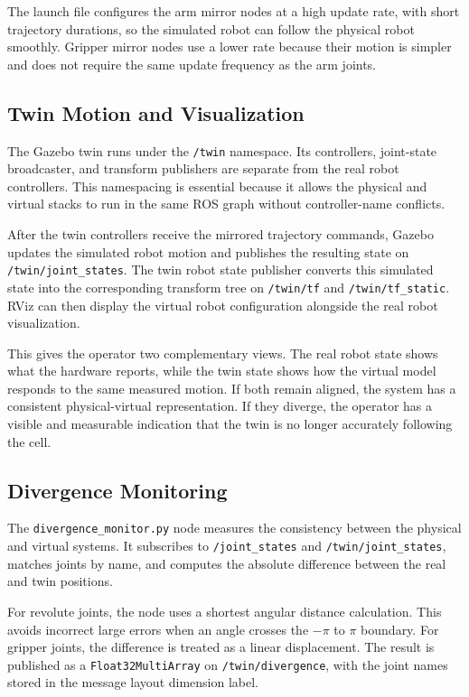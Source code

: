 The launch file configures the arm mirror nodes at a high update rate, with short trajectory durations, so the simulated robot can follow the physical robot smoothly. Gripper mirror nodes use a lower rate because their motion is simpler and does not require the same update frequency as the arm joints.

\subsection{Twin Motion and Visualization}

The Gazebo twin runs under the \texttt{/twin} namespace. Its controllers, joint-state broadcaster, and transform publishers are separate from the real robot controllers. This namespacing is essential because it allows the physical and virtual stacks to run in the same ROS graph without controller-name conflicts.

After the twin controllers receive the mirrored trajectory commands, Gazebo updates the simulated robot motion and publishes the resulting state on \texttt{/twin/joint\_states}. The twin robot state publisher converts this simulated state into the corresponding transform tree on \texttt{/twin/tf} and \texttt{/twin/tf\_static}. RViz can then display the virtual robot configuration alongside the real robot visualization.

This gives the operator two complementary views. The real robot state shows what the hardware reports, while the twin state shows how the virtual model responds to the same measured motion. If both remain aligned, the system has a consistent physical-virtual representation. If they diverge, the operator has a visible and measurable indication that the twin is no longer accurately following the cell.

\subsection{Divergence Monitoring}

The \texttt{divergence\_monitor.py} node measures the consistency between the physical and virtual systems. It subscribes to \texttt{/joint\_states} and \texttt{/twin/joint\_states}, matches joints by name, and computes the absolute difference between the real and twin positions.

For revolute joints, the node uses a shortest angular distance calculation. This avoids incorrect large errors when an angle crosses the \(-\pi\) to \(\pi\) boundary. For gripper joints, the difference is treated as a linear displacement. The result is published as a \texttt{Float32MultiArray} on \texttt{/twin/divergence}, with the joint names stored in the message layout dimension label.

